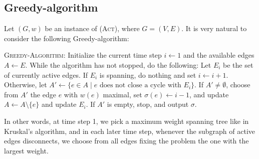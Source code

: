 \documentclass[runningheads]{llncs}
\numberwithin{equation}{section}
\newcommand{\set}[1]{\{ #1 \}}
\newcommand{\act}{\textsc{(Act)}}
\begin{document}
\subsection{Greedy-algorithm}

Let $(G, w)$ be an instance of {\act}, where $G  = (V, E)$. It is very natural to consider the following Greedy-algorithm:

\textsc{Greedy-Algorithm}: Initialize the current time step $i \leftarrow 1$ and the available edges $A \leftarrow E$. While the algorithm has not stopped, do the following: Let $E_i$ be the set of currently active edges. If $E_i$ is spanning, do nothing and set $i \leftarrow i+1$. Otherwise, let $A' \leftarrow \set{e \in A \mid e \text{ does not close a cycle with } E_i}$. If $A' \neq \emptyset$, choose from $A'$ the edge $e$ with $w(e)$ maximal, set $\sigma(e) \leftarrow i - 1$, and update $A \leftarrow A \setminus \set{e}$ and update $E_i$. If $A'$ is empty, stop, and output $\sigma$.

In other words, at time step 1, we pick a maximum weight spanning tree like in Kruskal's algorithm, and in each later time step, whenever the subgraph of active edges disconnects, we choose from all edges fixing the problem the one with the largest weight.
\end{document}

